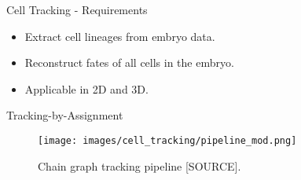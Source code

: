 \begin{frame}{Cell Tracking - Requirements}
    \begin{itemize}
          \item Extract cell lineages from embryo data.
          \item Reconstruct fates of all cells in the embryo.
          \item Applicable in 2D and 3D.
    \end{itemize}
\end{frame}


\begin{frame}{Tracking-by-Assignment}
    \begin{figure}
        \centering
        \texttt{[image: images/cell\_tracking/pipeline\_mod.png]}
        \caption{Chain graph tracking pipeline [SOURCE].}
        \label{fig:chaingraph-pipeline}
    \end{figure}
\end{frame}

